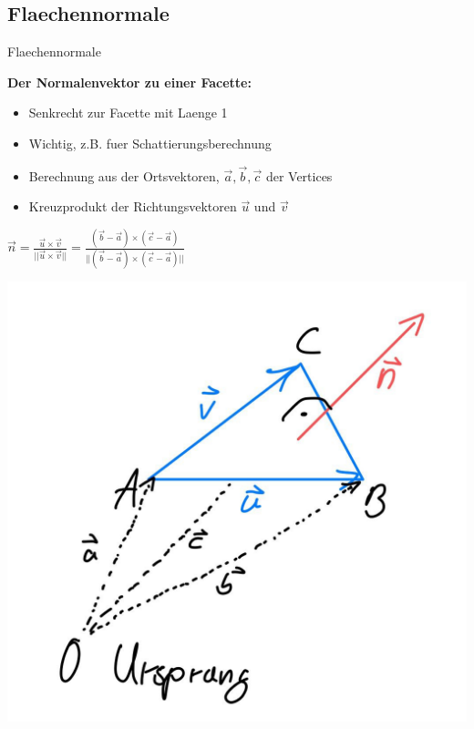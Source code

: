 \documentclass[10pt,aspectratio=169]{beamer}
\begin{document}
  \subsection{Flaechennormale}
  \begin{frame}{Flaechennormale}
    \begin{minipage}{8cm}
      \normalsize
      \textbf{Der Normalenvektor zu einer Facette:}
      \begin{itemize}
        \item Senkrecht zur Facette mit Laenge 1
        \item Wichtig, z.B. fuer Schattierungsberechnung
        \item Berechnung aus der Ortsvektoren, $\vec{a}, \vec{b}, \vec{c}$ der Vertices
        \item Kreuzprodukt der Richtungsvektoren $\vec{u}$ und $\vec{v}$
      \end{itemize}
      
      \vspace{0.2cm}
      \hspace{0.3cm}
      \large $\vec{n} = \frac{\vec{u} \times \vec{v}}{||\vec{u} \times \vec{v}||} = \frac{(\vec{b} - \vec{a}) \times (\vec{c} - \vec{a})}{||(\vec{b} - \vec{a}) \times (\vec{c} - \vec{a})||}$  
    
      
    \end{minipage}
    \begin{minipage}{3cm}
      \includegraphics[scale=0.125]{sketch_n_vec}  
    \end{minipage}
  \end{frame}
\end{document}
